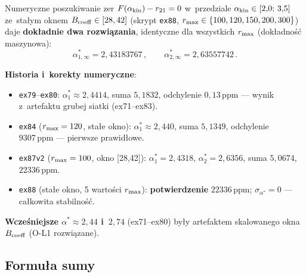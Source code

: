 \begin{result}%
\label{res:L-alpha-stars}
Numeryczne poszukiwanie zer $F(\alpha_{\rm kin}) - r_{21} = 0$
w~przedziale $\alpha_{\rm kin} \in [2{,}0;\, 3{,}5]$
ze~sta\l{}ym oknem $B_{\rm coeff}\in[28,42]$
(skrypt \texttt{ex88}, $r_{\rm max}\in\{100,120,150,200,300\}$)
daje \textbf{dok\l{}adnie dwa rozwiązania}, identyczne dla wszystkich
$r_{\rm max}$ (dok\l{}adno\'s\'c maszynowa):
\begin{equation}\label{eq:L-alpha-stars}
  \alpha^*_{1,\infty} = 2{,}43183767\,,
  \qquad
  \alpha^*_{2,\infty} = 2{,}63557742\,.
\end{equation}

\textbf{Historia i~korekty numeryczne}:
\begin{itemize}[nosep]
  \item \texttt{ex79}--\texttt{ex80}: $\alpha^*_1 \approx 2{,}4414$, suma $5{,}1832$,
    odchylenie $0{,}13\,\text{ppm}$ --- wynik z~artefaktu grubej siatki (ex71--ex83).
  \item \texttt{ex84} ($r_{\rm max}=120$, sta\l{}e okno): $\alpha^*_1 \approx 2{,}440$,
    suma $5{,}1349$, odchylenie $9307\,\text{ppm}$ --- pierwsze prawid\l{}owe.
  \item \texttt{ex87v2} ($r_{\rm max}=100$, okno [28,42]): $\alpha^*_1=2{,}4318$,
    $\alpha^*_2=2{,}6356$, suma $5{,}0674$, $22336\,\text{ppm}$.
  \item \texttt{ex88} (sta\l{}e okno, 5 warto\'sci $r_{\rm max}$): \textbf{potwierdzenie}
    $22336\,\text{ppm}$; $\sigma_{\alpha^*} = 0$ --- ca\l{}kowita stabilno\'s\'c.
\end{itemize}

\textbf{Wcze\'sniejsze $\alpha^* \approx 2{,}44$ i~$2{,}74$} (ex71--ex80) by\l{}y
artefaktem skalowanego okna $B_{\rm coeff}$ (O-L1 rozwi\k{a}zane).
\end{result}

\subsection{Formuła sumy}
\label{app:L-suma}

